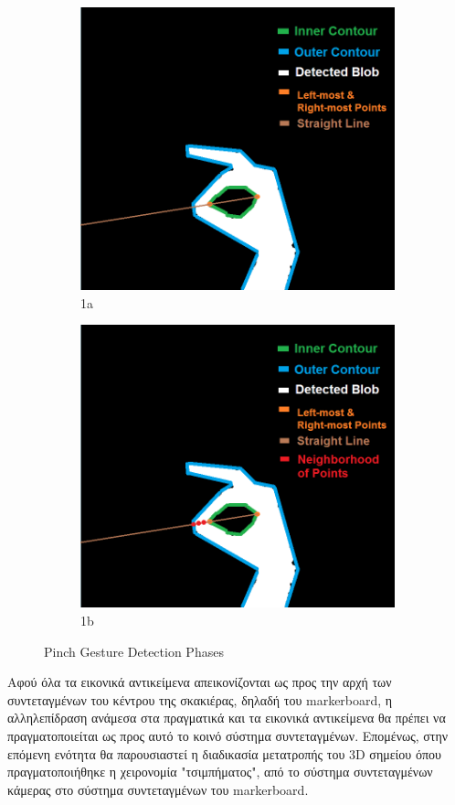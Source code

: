 \begin{figure}[H]
\begin{subfigure}{.5\textwidth}
  \includegraphics[width=.8\linewidth]{Files/Figures/4.png}
  \caption{1a}
  \label{fig:sfig1}
\end{subfigure}%
\begin{subfigure}{.5\textwidth}
  \centering
  \includegraphics[width=.8\linewidth]{Files/Figures/5.png}
  \caption{1b}
  \label{fig:sfig2}
\end{subfigure}
\caption{Pinch Gesture Detection Phases}
\label{fig:fig}
\end{figure}



Αφού όλα τα εικονικά αντικείμενα απεικονίζονται ως προς την αρχή των συντεταγμένων του κέντρου της σκακιέρας, δηλαδή του markerboard, η αλληλεπίδραση ανάμεσα στα πραγματικά και τα εικονικά αντικείμενα θα πρέπει να πραγματοποιείται ως προς αυτό το κοινό σύστημα συντεταγμένων. Επομένως, στην επόμενη ενότητα θα παρουσιαστεί η διαδικασία μετατροπής του 3D σημείου όπου πραγματοποιήθηκε η χειρονομία "τσιμπήματος", από το σύστημα συντεταγμένων κάμερας στο σύστημα συντεταγμένων του markerboard.



